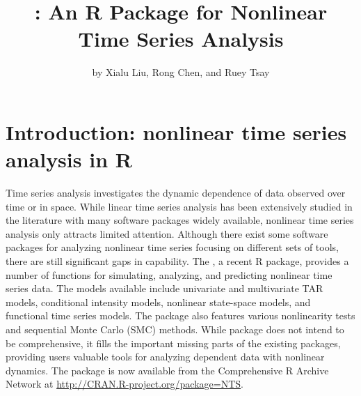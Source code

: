 \title{: An \bf{R} Package for Nonlinear Time Series Analysis}
\author{by Xialu Liu, Rong Chen, and Ruey Tsay}

\maketitle

\section{Introduction: nonlinear time series analysis in R}\label{sec:intro}


Time series analysis investigates the dynamic dependence of data observed over time or in space. While linear time series analysis has been extensively studied in the literature with many software packages widely available, nonlinear time series analysis only attracts limited attention. Although there exist some software packages for analyzing nonlinear time series focusing on different sets of tools, there are still significant gaps in capability. The , a recent {R} \citep{R} package, provides a number of functions for simulating, analyzing, and predicting nonlinear time series data. The models available include univariate and multivariate TAR models, conditional intensity models,
nonlinear state-space models, and functional time series models. The package also features various nonlinearity tests and sequential Monte Carlo (SMC) methods. While  package does not intend to be comprehensive, it fills the important missing parts of the existing packages, providing users valuable tools for analyzing dependent data with nonlinear dynamics. The package is now available from the Comprehensive {R} Archive Network at \url{http://CRAN.R-project.org/package=NTS}.

